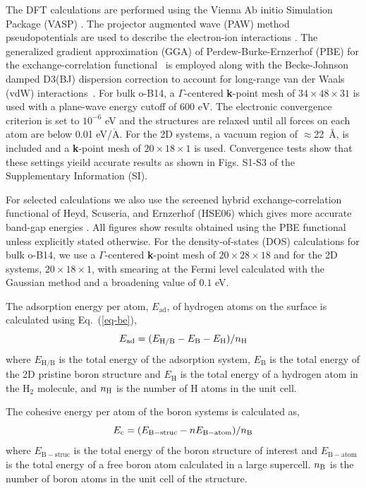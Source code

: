 \documentclass[aps,prb,preprint,notitlepage]{revtex4-2}
\begin{document}
The DFT calculations are performed using the  
Vienna Ab initio Simulation Package (VASP) 
\cite{kresse1993ab,kresse1996efficiency,kresse1994ef,kresse1994ab}. The projector 
augmented wave (PAW) method pseudopotentials are used to 
describe the electron-ion interactions \cite{kresse1999ultrasoft}. 
The generalized gradient approximation (GGA) of Perdew-Burke-Ernzerhof (PBE) 
for the exchange-correlation functional~\cite{PBE-1996} is employed along with the 
Becke-Johnson damped D3(BJ) dispersion correction to account for long-range 
van der Waals (vdW) interactions~\cite{D3BJ2005,D3BJ2010,D3BJ2011}. 
For bulk o-B14, a $\Gamma$-centered {\bf k}-point 
mesh of $34 \times 48 \times 31$ is used with a plane-wave energy cutoff of 
$600\text{ eV}$. 
The electronic convergence criterion is set to $10^{-6}$ eV and the structures
are relaxed until all forces on each atom are below 0.01 eV/$\mathring{\text{A}}$. 
For the 2D systems, a vacuum region of $\approx$22~\AA, is included and 
a {\bf k}-point
mesh of $20 \times 18 \times 1$ is used.
Convergence tests show that these settings yieild accurate results as 
shown in Figs. S1-S3 of the Supplementary Information (SI).  


For selected calculations we also use the screened hybrid exchange-correlation 
functional of Heyd, Scuseria, and Ernzerhof (HSE06) which gives more 
accurate band-gap energies \cite{PBE_Vs_HSE06_2021, HSE06_2003, HSE06_2006}. 
All figures show results obtained using the PBE functional unless explicitly stated otherwise.
For the density-of-states (DOS) calculations for bulk o-B14, we 
use a $\Gamma$-centered {\bf k}-point 
mesh of $20 \times 28 \times 18$ and for the 2D systems, 
$20 \times 18 \times 1$,  with smearing at the Fermi level 
calculated with the Gaussian method and a broadening value of $0.1$ eV. 

The adsorption energy per atom, $E_{\mathrm{ad}}$, of hydrogen atoms on the surface is 
calculated using Eq.~(\ref{eq-be}), 
\begin{equation}
	E_{\mathrm{ad}} = (E_{\mathrm{H/B}} - E_{\mathrm{B}} - E_{\mathrm{H}})/n_{\rm H}
    \label{eq-be}
\end{equation}
where $E_{\mathrm{H/B}}$ is the total energy of the adsorption system, $E_{\mathrm{B}}$ is the total energy of the 2D 
pristine boron structure and $E_{\mathrm{H}}$ is the total energy of a 
hydrogen atom in the H$_{2}$ molecule, and $n_{\rm H}$ is the number
of H atoms in the unit cell.   

The cohesive energy per atom of the boron systems is calculated as,
\begin{equation}
	E_{\mathrm{c}} = (E_{\mathrm{B-struc}} - nE_{\mathrm{B-atom}})/n_{\rm B} 
    \label{eqn:binding_energy}
\end{equation}
where $E_{\mathrm{B-struc}}$ is the total energy of the boron structure of interest and
$E_{\mathrm{B-atom}}$ is the total energy of a free boron atom calculated in a large
supercell. $n_{\rm B}$ is the number of boron atoms in the unit cell of the structure.
\end{document}
